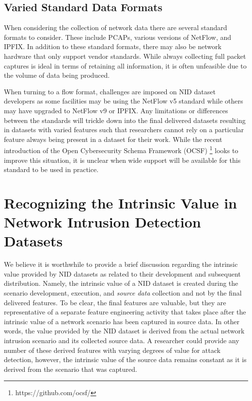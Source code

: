 \documentclass[conference]{IEEEtran}
\begin{document}
\subsection{Varied Standard Data Formats}\label{subsec:nostandard}
When considering the collection of network data there are several standard formats to consider.
These include PCAPs, various versions of NetFlow, and IPFIX.
In addition to these standard formats, there may also be network hardware that only support vendor standards.
While always collecting full packet captures is ideal in terms of retaining all information, it is often unfeasible due to the volume of data being produced.

When turning to a flow format, challenges are imposed on NID dataset developers as some facilities may be using the NetFlow v5 standard while others may have upgraded to NetFlow v9 or IPFIX.
Any limitations or differences between the standards will trickle down into the final delivered datasets resulting in datasets with varied features such that researchers cannot rely on a particular feature always being present in a dataset for their work.
While the recent introduction of the Open Cybersecurity Schema Framework (OCSF) \footnote{https://github.com/ocsf/} looks to improve this situation, it is unclear when wide support will be available for this  standard to be used in practice.

\section{Recognizing the Intrinsic Value in Network Intrusion Detection Datasets}\label{sec:intrinsic_value}
We believe it is worthwhile to provide a brief discussion regarding the intrinsic value provided by NID datasets as related to their development and subsequent distribution.
Namely, the intrinsic value of a NID dataset is created during the scenario development, execution, and \textit{source data} collection and not by the final delivered features.
To be clear, the final features are valuable, but they are representative of a separate feature engineering activity that takes place after the intrinsic value of a network scenario has been captured in source data.
In other words, the value provided by the NID dataset is derived from the actual network intrusion scenario and its collected source data. 
A researcher could provide any number of these derived features with varying degrees of value for attack detection, however, the intrinsic value of the source data remains constant as it is derived from the scenario that was captured.
\end{document}
